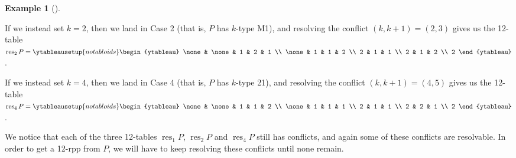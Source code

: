 \documentclass[numbers=enddot,12pt,final,onecolumn,notitlepage]{scrartcl}%
\theoremstyle{definition}
\newtheorem{exmp}[theo]{Example}
\newenvironment{example}[1][]
{\begin{exmp}[#1]\begin{leftbar}}
{\end{leftbar}\end{exmp}}
\begin{document}
\begin{example}
If we instead set $k=2$, then we land in Case 2 (that is, $P$ has $k$-type
M1), and resolving the conflict $\left(  k,k+1\right)  =\left(  2,3\right)  $
gives us the 12-table $\operatorname*{res}\nolimits_{2}P=%
\ytableausetup{notabloids}
\begin{ytableau}
\none& \none& 1 & 2 & 1 \\
\none& 1 & 1 & 2 \\
2 & 1 & 1 \\
2 & 1 & 2 \\
2
\end{ytableau}%
$.

If we instead set $k=4$, then we land in Case 4 (that is, $P$ has $k$-type
21), and resolving the conflict $\left(  k,k+1\right)  =\left(  4,5\right)  $
gives us the 12-table $\operatorname*{res}\nolimits_{4}P=%
\ytableausetup{notabloids}
\begin{ytableau}
\none& \none& 1 & 1 & 2 \\
\none& 1 & 1 & 1 \\
2 & 1 & 1 \\
2 & 2 & 1 \\
2
\end{ytableau}%
$.

We notice that each of the three 12-tables $\operatorname*{res}\nolimits_{1}%
P$, $\operatorname*{res}\nolimits_{2}P$ and $\operatorname*{res}%
\nolimits_{4}P$ still has conflicts\footnotemark, and again some of these
conflicts are resolvable. In order to get a 12-rpp from $P$, we will have to
keep resolving these conflicts until none remain.
\end{example}
\end{document}
